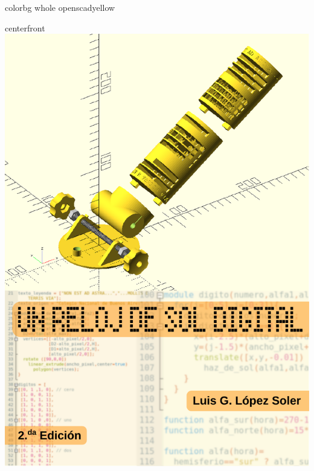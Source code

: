 \documentclass[coverwidth=148mm, coverheight=210mm, spinewidth=30mm,
flapwidth=7cm, wrapwidth=5mm, 11pt]{bookcover}
\begin{document}
\begin{bookcover}

  \begin{bookcoverelement}{color}{bg whole}
    openscadyellow
  \end{bookcoverelement}

  \begin{bookcoverelement}{center}{front}
    \includegraphics[width=\partwidth]{tapa-A5.pdf}
  \end{bookcoverelement}


\end{bookcover}
\end{document}
